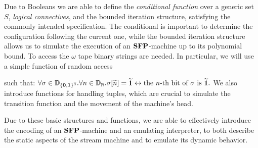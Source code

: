 \begin{conditional}{\shortonly}
  Due to Booleans we are able to define the
  \emph{conditional function}
  over a generic set $S$,
  \emph{logical connectives},
  and the bounded iteration structure,
  satisfying
  the commonly intended specification.
  The conditional is important to
  determine the configuration following the
  current one, while
  the bounded iteration
  structure allows us to simulate
  the execution of an $\mathbf{SFP}$-machine
  up to its polynomial bound.
  To access the $\omega$ tape binary strings are needed.
  In particular, we will use a simple function of random access

  such that:
  $
  \forall \sigma \in \mathbb{D}_{\{\mathbf{0},\mathbf{1}\}^{\mathbb{N}}}. \forall n\in \mathbb{D}_{\mathbb{N}}. \sigma[\widetilde{n}] = \widetilde{\mathbf{1}} \leftrightarrow \text{the } n\text{-th bit of } \sigma \text{ is } \widetilde{\mathbf{1}}.
  $
  We also introduce functions for handling tuples,
  which are crucial to simulate the transition
  function and the movement of the machine's head.

  Due to these basic structures and functions,
  we are able to effectively introduce the encoding
  of an $\mathbf{SFP}$-machine
  and an emulating interpreter,
  to both describe the static aspects of the stream
  machine
  and to emulate its dynamic behavior.

\end{conditional}


